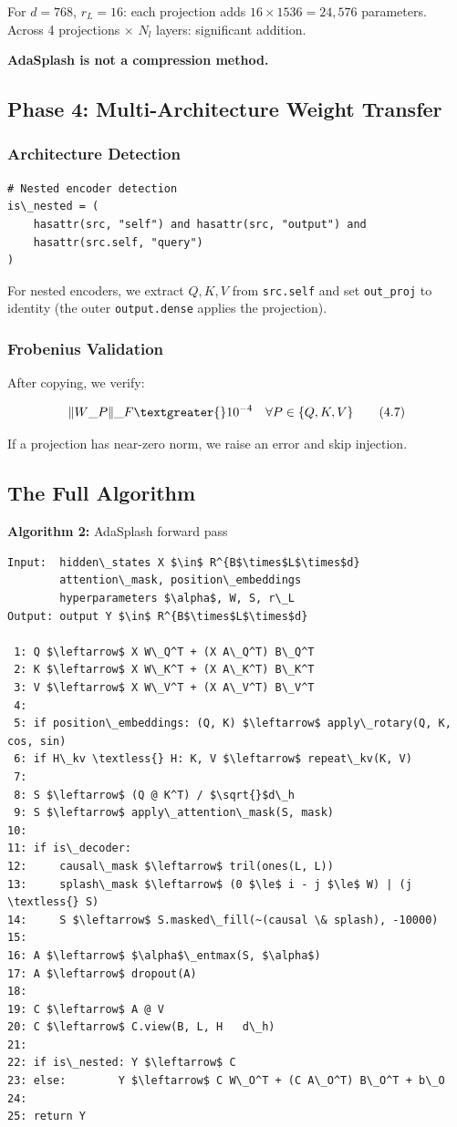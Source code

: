 For $d = 768$, $r_L = 16$: each projection adds $16 \times 1536 = 24{,}576$ 
parameters. Across 4 projections $\times$ $N_l$ layers: significant addition.

\textbf{AdaSplash is not a compression method.}

\subsection{Phase 4: Multi-Architecture Weight Transfer}

\subsubsection{Architecture Detection}

\begin{lstlisting}
# Nested encoder detection
is\_nested = (
    hasattr(src, "self") and hasattr(src, "output") and
    hasattr(src.self, "query")
)
\end{lstlisting}

For nested encoders, we extract $Q, K, V$ from \texttt{src.self} and set 
\texttt{out\_proj} to identity (the outer \texttt{output.dense} applies the projection).

\subsubsection{Frobenius Validation}

After copying, we verify:

\[
\|W\_P\|\_F \textgreater{} 10^{-4} \quad \forall P \in \{Q, K, V\}
\tag{4.7}
\]

If a projection has near-zero norm, we raise an error and skip injection.

\subsection{The Full Algorithm}

\textbf{Algorithm 2:} AdaSplash forward pass
\begin{lstlisting}
Input:  hidden\_states X $\in$ R^{B$\times$L$\times$d}
        attention\_mask, position\_embeddings
        hyperparameters $\alpha$, W, S, r\_L
Output: output Y $\in$ R^{B$\times$L$\times$d}

 1: Q $\leftarrow$ X W\_Q^T + (X A\_Q^T) B\_Q^T
 2: K $\leftarrow$ X W\_K^T + (X A\_K^T) B\_K^T
 3: V $\leftarrow$ X W\_V^T + (X A\_V^T) B\_V^T
 4:
 5: if position\_embeddings: (Q, K) $\leftarrow$ apply\_rotary(Q, K, cos, sin)
 6: if H\_kv \textless{} H: K, V $\leftarrow$ repeat\_kv(K, V)
 7:
 8: S $\leftarrow$ (Q @ K^T) / $\sqrt{}$d\_h
 9: S $\leftarrow$ apply\_attention\_mask(S, mask)
10:
11: if is\_decoder:
12:     causal\_mask $\leftarrow$ tril(ones(L, L))
13:     splash\_mask $\leftarrow$ (0 $\le$ i - j $\le$ W) | (j \textless{} S)
14:     S $\leftarrow$ S.masked\_fill(~(causal \& splash), -10000)
15:
16: A $\leftarrow$ $\alpha$\_entmax(S, $\alpha$)
17: A $\leftarrow$ dropout(A)
18:
19: C $\leftarrow$ A @ V
20: C $\leftarrow$ C.view(B, L, H   d\_h)
21:
22: if is\_nested: Y $\leftarrow$ C
23: else:        Y $\leftarrow$ C W\_O^T + (C A\_O^T) B\_O^T + b\_O
24:
25: return Y
\end{lstlisting}

